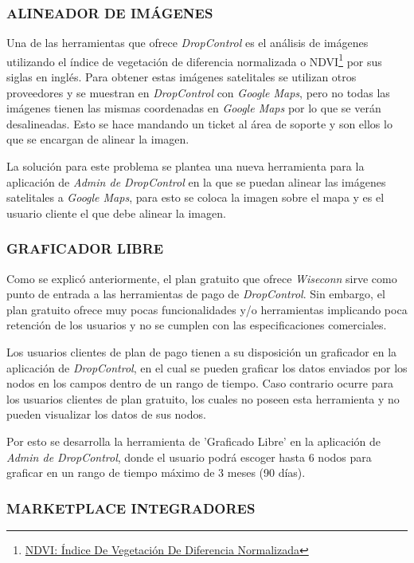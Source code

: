 \subsubsection{ALINEADOR DE IMÁGENES}

Una de las herramientas que ofrece \textit{DropControl} es el análisis de imágenes utilizando 
el índice de vegetación de diferencia normalizada o NDVI\footnote{\href{https://eos.com/es/make-an-analysis/ndvi/}{NDVI: Índice De Vegetación De Diferencia Normalizada}} por sus siglas en inglés. Para obtener estas imágenes satelitales
se utilizan otros proveedores y se muestran en \textit{DropControl} con \textit{Google Maps}, pero no todas las imágenes tienen
las mismas coordenadas en \textit{Google Maps} por lo que se verán desalineadas. Esto se hace mandando un ticket al área de soporte
y son ellos lo que se encargan de alinear la imagen.

La solución para este problema se plantea una nueva herramienta para la aplicación de \textit{Admin de DropControl} en la que 
se puedan alinear las imágenes satelitales a \textit{Google Maps}, para esto se coloca la imagen sobre el mapa y es el usuario cliente
el que debe alinear la imagen.

\subsubsection{GRAFICADOR LIBRE}

Como se explicó anteriormente, el plan gratuito que ofrece \textit{Wiseconn} sirve como punto de entrada a las herramientas
de pago de \textit{DropControl}. Sin embargo, el plan gratuito ofrece muy pocas funcionalidades y/o herramientas
implicando poca retención de los usuarios y no se cumplen con las especificaciones comerciales.

Los usuarios clientes de plan de pago tienen a su disposición un graficador en la aplicación de \textit{DropControl}, en el cual
se pueden graficar los datos enviados por los nodos en los campos dentro de un rango de tiempo.
Caso contrario ocurre para los usuarios clientes de plan gratuito, los cuales no poseen esta herramienta y 
no pueden visualizar los datos de sus nodos.

Por esto se desarrolla la herramienta de 'Graficado Libre' en la aplicación de \textit{Admin de DropControl}, 
donde el usuario podrá escoger hasta 6 nodos para graficar en un rango de tiempo máximo de 3 meses (90 días).

\subsubsection{MARKETPLACE INTEGRADORES}



